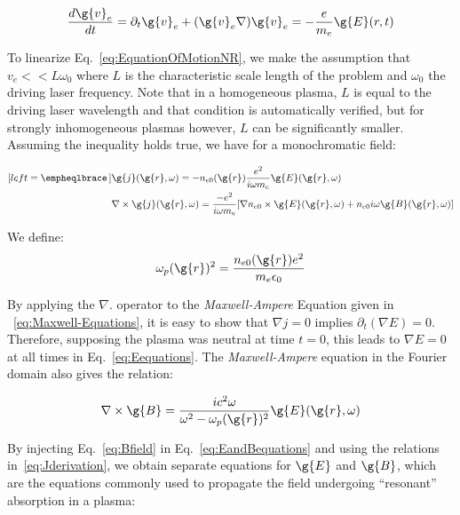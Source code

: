 \begin{equation}
\frac{d\g{v}_e}{dt}=\partial_t\g{v}_e + (\g{v}_e\nabla )\g{v}_e = -\frac{e}{m_e}\g{E}(r,t) 
\label{eq:EquationOfMotionNR}
\end{equation}

\noindent To linearize Eq.~\ref{eq:EquationOfMotionNR}, we make the assumption that $v_e<<L \omega_0$ where $L$ is the characteristic scale length of the problem and $\omega_0$ the driving laser frequency. Note that in a homogeneous plasma, $L$ is equal to the driving laser wavelength and that condition is automatically verified, but for strongly inhomogeneous plasmas however, $L$ can be significantly smaller. Assuming the inequality holds true, we have for a monochromatic field:

\begin{subequations}
\label{eq:Jderivation}
\begin{align}[left = \empheqlbrace\,]
&\g{j}(\g{r},\omega) = - n_{e0}(\g{r})\frac{e^2}{i\omega m_e}\g{E}(\g{r},\omega)  \label{eq:PartialJ} \\
&\nabla \times \g{j}(\g{r},\omega) = \frac{-e^2}{i\omega m_e}[\nabla n_{e0} \times \g{E}(\g{r},\omega)+n_{e0} i\omega\g{ B}(\g{r},\omega) ]\label{eq:NablaJ} 
\end{align}
\end{subequations}

\noindent We define:
$$
\omega_p(\g{r})^2 = \frac{n_{e0}(\g{r})e^2}{m_e\epsilon_0}
$$


\noindent By applying the $\nabla.$ operator to the \textit{Maxwell-Ampere} Equation given in ~\ref{eq:Maxwell-Equations}, it is easy to show that $\nabla j =0$ implies $\partial_t (\nabla E) = 0$.
Therefore, supposing the plasma was neutral at time $t=0$, this leads to $\nabla E = 0$ at all times in Eq.~\ref{eq:Eequations}. The
\textit{Maxwell-Ampere} equation in the Fourier domain also gives the relation:

\begin{equation}
\label{eq:Bfield}
\nabla \times \g{B} = \frac{ic^2\omega}{\omega^2-\omega_p(\g{r})^2}\g{E}(\g{r},\omega)
\end{equation}

\noindent  By injecting Eq.~\ref{eq:Bfield}  in Eq.~\ref{eq:EandBequations} and using the relations in~\ref{eq:Jderivation}, we obtain separate equations for $\g{E}$ and $\g{B}$, which are the equations commonly used to propagate the field undergoing ``resonant'' absorption in a plasma:



